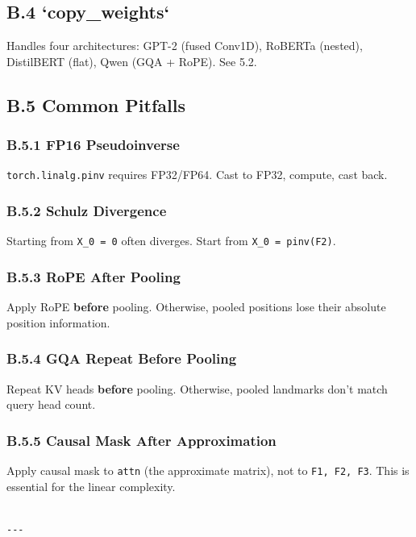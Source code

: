 \subsection{B.4 `copy\_weights`}

Handles four architectures: GPT-2 (fused Conv1D), RoBERTa (nested), DistilBERT 
(flat), Qwen (GQA + RoPE). See  5.2.

\subsection{B.5 Common Pitfalls}

\subsubsection{B.5.1 FP16 Pseudoinverse}

\texttt{torch.linalg.pinv} requires FP32/FP64. Cast to FP32, compute, cast back.

\subsubsection{B.5.2 Schulz Divergence}

Starting from \texttt{X\_0 = 0} often diverges. Start from \texttt{X\_0 = pinv(F2)}.

\subsubsection{B.5.3 RoPE After Pooling}

Apply RoPE \textbf{before} pooling. Otherwise, pooled positions lose their 
absolute position information.

\subsubsection{B.5.4 GQA Repeat Before Pooling}

Repeat KV heads \textbf{before} pooling. Otherwise, pooled landmarks don't match 
query head count.

\subsubsection{B.5.5 Causal Mask After Approximation}

Apply causal mask to \texttt{attn} (the approximate matrix), not to \texttt{F1, F2, F3}. 
This is essential for the linear complexity.
\begin{lstlisting}

---
\end{lstlisting}
